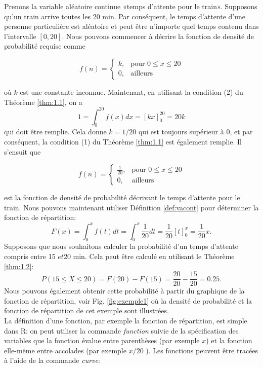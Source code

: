 \begin{example}\label{exemple:1}
Prenons la variable aléatoire continue «temps d'attente pour le train». Supposons qu'un train arrive toutes les 20 min.
Par conséquent, le temps d'attente d'une personne particulière est aléatoire et peut être n'importe quel temps contenu
dans l'intervalle $ [0, 20] $. Nous pouvons commencer à décrire la fonction de densité de probabilité requise comme

$$f(n) = \begin{cases} k, & \mbox{pour   } 0\leq x\leq20 \\ 0, & \mbox{ailleurs } \end{cases}$$

où $k$ est une constante inconnue. Maintenant, en utilisant la condition (2) du Théorème \ref{thm:1.1}, on a
$$1=\int_0^{20}f(x)dx=[kx]_{0}^{20}=20k$$
qui doit être remplie. Cela donne $ k = 1/20 $ qui est toujours supérieur à 0, et par conséquent, la condition (1)
du Théorème \ref{thm:1.1} est également remplie. Il s'ensuit que

$$f(n) = \begin{cases} \frac{1}{20}, & \mbox{pour   } 0\leq x\leq20 \\ 0, & \mbox{ailleurs } \end{cases}$$

est la fonction de densité de probabilité décrivant le temps d'attente pour le train. Nous pouvons maintenant utiliser
Définition \ref{def:vacont} pour déterminer la fonction de répartition:
$$F(x)=\int_{0}^{x}f(t)dt=\int_{0}^{x}\frac{1}{20}dt=\frac{1}{20}[t]_{0}^{x}=\frac{1}{20}x.$$
Supposons que nous souhaitons calculer la probabilité d'un temps d'attente compris entre 15 $ et 20 $ min.
Cela peut être calculé en utilisant le Théorème \ref{thm:1.2}:
$$P(15\leq X\leq20)=F(20)-F(15)=\frac{20}{20}-\frac{15}{20}=0.25.$$
Nous pouvons également obtenir cette probabilité à partir du graphique de la fonction de répartition, voir Fig. \ref{fig:exemple1}
où la densité de probabilité et la fonction de répartition de cet exemple sont illustrées.\\

La définition d'une fonction, par exemple la fonction de répartition, est simple dans R: on peut utiliser
la commande \textit{function} suivie de la spécification des variables que la fonction évalue entre parenthèses
(par exemple $ x $) et la fonction elle-même entre accolades (par exemple $ x / 20 $ ). Les fonctions peuvent être
tracées à l'aide de la commande \textit{curve}:


\end{example}
